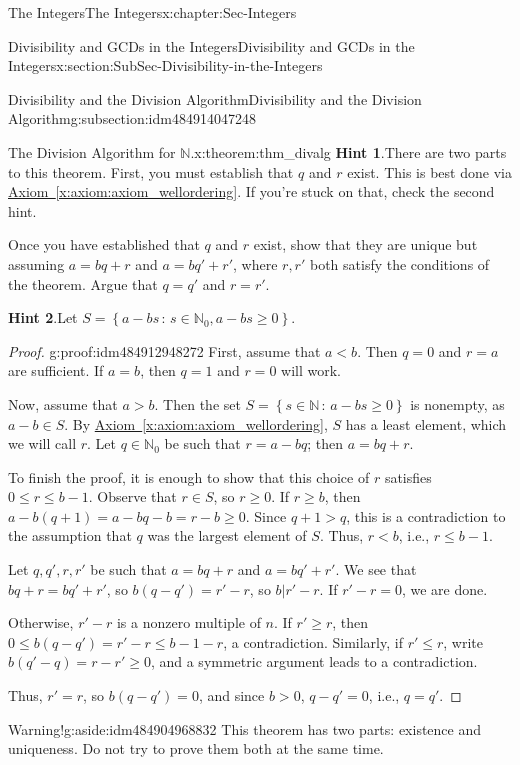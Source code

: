 \documentclass[oneside,10pt,]{book}
\newcommand{\blocktitlefont}{\relax}
\newcommand{\xreffont}{\relax}
\numberwithin{equation}{section}
\renewcommand{\le}{\leqslant}
\renewcommand{\ge}{\geqslant}
\newcommand{\setof}[2]{{\left\{#1\,\colon\,#2\right\}}}
\def\N{{\mathbb N}}
\newcommand{\lt}{<}
\begin{document}
\begin{chapterptx}{The Integers}{}{The Integers}{}{}{x:chapter:Sec-Integers}
\begin{sectionptx}{Divisibility and GCDs in the Integers}{}{Divisibility and GCDs in the Integers}{}{}{x:section:SubSec-Divisibility-in-the-Integers}
\begin{subsectionptx}{Divisibility and the Division Algorithm}{}{Divisibility and the Division Algorithm}{}{}{g:subsection:idm484914047248}
\begin{theorem}{The Division Algorithm for \(\N\).}{}{x:theorem:thm_divalg}
\textbf{\blocktitlefont Hint 1}.\quad{}There are two parts to this theorem. First, you must establish that \(q\) and \(r\) exist. This is best done via \hyperref[x:axiom:axiom_wellordering]{Axiom~{\xreffont\ref{x:axiom:axiom_wellordering}}}. If you're stuck on that, check the second hint.%
\par
Once you have established that \(q\) and \(r\) exist, show that they are unique but assuming \(a = bq+r\) and \(a = bq' + r'\), where \(r,r'\) both satisfy the conditions of the theorem. Argue that \(q = q'\) and \(r = r'\).%
\par\smallskip%
\noindent
\textbf{\blocktitlefont Hint 2}.\quad{}Let \(S = \setof{a-bs}{s\in \N_0, a-bs\ge 0}\).%
\end{theorem}
\begin{proof}{}{g:proof:idm484912948272}
First, assume that \(a \lt b\). Then \(q = 0\) and \(r = a\) are sufficient. If \(a = b\), then \(q = 1\) and \(r = 0\) will work.%
\par
Now, assume that \(a > b\). Then the set \(S = \setof{s\in\N}{a-bs \ge 0}\) is nonempty, as \(a-b\in S\). By \hyperref[x:axiom:axiom_wellordering]{Axiom~{\xreffont\ref{x:axiom:axiom_wellordering}}}, \(S\) has a least element, which we will call \(r\). Let \(q\in \N_0\) be such that \(r = a-bq\); then \(a = bq + r\).%
\par
To finish the proof, it is enough to show that this choice of \(r\) satisfies \(0\le r \le b-1\). Observe that \(r\in S\), so \(r\ge 0\). If \(r \ge b\), then \(a - b(q+1) = a-bq -b = r -b \ge 0\). Since \(q+1 > q\), this is a contradiction to the assumption that \(q\) was the largest element of \(S\). Thus, \(r \lt b\), i.e., \(r \le b-1\).%
\par
Let \(q,q',r,r'\) be such that \(a = bq+r\) and \(a=bq'+r'\). We see that \(bq+r = bq' + r'\), so \(b(q-q') = r'-r\), so \(b|r'-r\). If \(r'-r = 0\), we are done.%
\par
Otherwise, \(r'-r\) is a nonzero multiple of \(n\). If \(r' \ge r\), then \(0\le b(q-q') = r' - r \le b-1 - r\), a contradiction. Similarly, if \(r' \le r\), write \(b(q'-q) = r-r' \ge 0\), and a symmetric argument leads to a contradiction.%
\par
Thus, \(r' = r\), so \(b(q-q') = 0\), and since \(b > 0\), \(q - q'= 0\), i.e., \(q = q'\).%
\end{proof}
\begin{aside}{Warning!}{g:aside:idm484904968832}%
This theorem has two parts: existence and uniqueness. Do not try to prove them both at the same time.%

\end{aside}
\end{subsectionptx}
\end{sectionptx}
\end{chapterptx}
\end{document}
